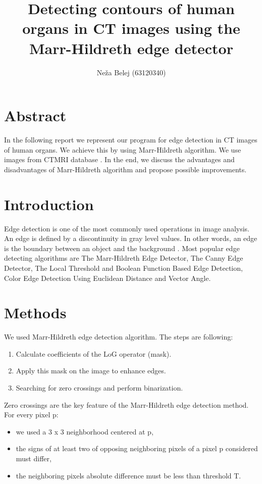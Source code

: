 \documentclass[a4paper,10pt]{article}
\title{Detecting contours of human organs in CT images using the Marr-Hildreth edge detector}
\author{Neža Belej (63120340)}
\begin{document}
\maketitle
\section {Abstract}
In the following report we represent our program for edge detection in CT images of human organs. We achieve this by using Marr-Hildreth algorithm. We use images from CTMRI database \cite{db}. In the end, we discuss the advantages and disadvantages of Marr-Hildreth algorithm and propose possible improvements.
\section{Introduction}
Edge detection is one of the most commonly used
operations in image analysis. An edge is defined by a
discontinuity in gray level values. In other words, an edge
is the boundary between an object and the background \cite{article1}. Most popular edge detecting algorithms are The Marr-Hildreth Edge Detector, The Canny Edge Detector, The Local Threshold and Boolean Function Based Edge Detection, Color Edge Detection Using Euclidean Distance and Vector Angle. \cite{article2}

\section{Methods}
We used Marr-Hildreth edge detection algorithm. The steps are following:
\begin{enumerate}
\item{Calculate coefficients of the LoG operator (mask).}
\item{Apply this mask on the image to enhance edges.}
\item{Searching for zero crossings and perform binarization.}
\end{enumerate}

Zero crossings are the key feature of the Marr-Hildreth edge detection method. For every pixel p:
\begin{itemize}
\item{we used a 3 x 3 neighborhood centered at p,}
\item{the signs of at least two of opposing neighboring pixels of a pixel p considered must differ,}
\item{the neighboring pixels absolute difference must be less than threshold T.}
\end{itemize}
\end{document}
